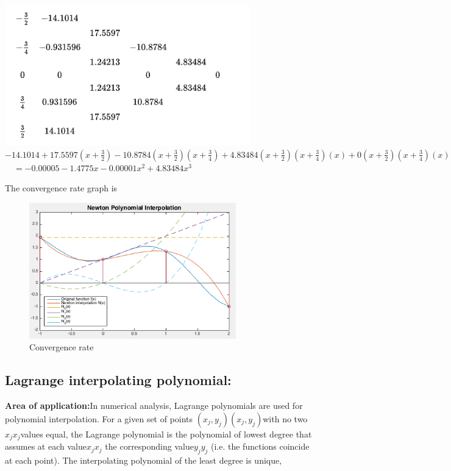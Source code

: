 \documentclass{article}
\begin{document}
		\includegraphics[width=0.8\textwidth, height=0.6\textwidth]{newton_poly_ex.png}
	$- 14.1014 + 17.5597 \left( x + \frac { 3 } { 2 } \right) - 10.8784 \left( x + \frac { 3 } { 2 } \right) \left( x + \frac { 3 } { 4 } \right) + 4.83484 \left( x + \frac { 3 } { 2 } \right) \left( x + \frac { 3 } { 4 } \right) ( x ) + 0 \left( x + \frac { 3 } { 2 } \right) \left( x + \frac { 3 } { 4 } \right) ( x ) \left( x - \frac { 3 } { 4 } \right) =$
	$\quad = - 0.00005 - 1.4775 x - 0.00001 x ^ { 2 } + 4.83484 x ^ { 3 }$

	The convergence rate graph is
	\begin{figure}[H]
		\caption{Convergence rate}
		\includegraphics[width=0.8\textwidth, height=0.6\textwidth]{NewtonInterpolationEx.png}
	\end{figure}
	\subsection{Lagrange interpolating polynomial:}
{\bf Area of application:}In numerical analysis, Lagrange polynomials are used for polynomial interpolation. For a given set of points $ {\displaystyle (x_{j},y_{j})} {\displaystyle (x_{j},y_{j})}  $with no two $ {\displaystyle x_{j}} x_{j}  $values equal, the Lagrange polynomial is the polynomial of lowest degree that assumes at each value$  {\displaystyle x_{j}} x_{j} $ the corresponding value$  {\displaystyle y_{j}} y_{j} $ (i.e. the functions coincide at each point). The interpolating polynomial of the least degree is unique, 
\end{document}
